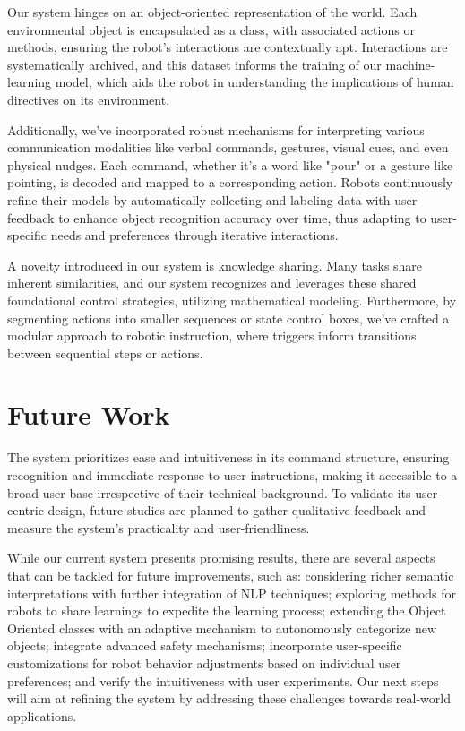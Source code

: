 \documentclass[conference]{IEEEtran}
\begin{document}
Our system hinges on an object-oriented representation of the world. Each environmental object is encapsulated as a class, with associated actions or methods, ensuring the robot's interactions are contextually apt. Interactions are systematically archived, and this dataset informs the training of our machine-learning model, which aids the robot in understanding the implications of human directives on its environment.

Additionally, we've incorporated robust mechanisms for interpreting various communication modalities like verbal commands, gestures, visual cues, and even physical nudges. Each command, whether it's a word like "pour" or a gesture like pointing, is decoded and mapped to a corresponding action. Robots continuously refine their models by automatically collecting and labeling data with user feedback to enhance object recognition accuracy over time, thus adapting to user-specific needs and preferences through iterative interactions.

A novelty introduced in our system is knowledge sharing. Many tasks share inherent similarities, and our system recognizes and leverages these shared foundational control strategies, utilizing mathematical modeling. Furthermore, by segmenting actions into smaller sequences or state control boxes, we've crafted a modular approach to robotic instruction, where triggers inform transitions between sequential steps or actions.

\section{Future Work}

The system prioritizes ease and intuitiveness in its command structure, ensuring recognition and immediate response to user instructions, making it accessible to a broad user base irrespective of their technical background. To validate its user-centric design, future studies are planned to gather qualitative feedback and measure the system's practicality and user-friendliness. 

While our current system presents promising results, there are several aspects that can be tackled for future improvements, such as: considering richer semantic interpretations with further integration of NLP techniques; exploring methods for robots to share learnings to expedite the learning process; extending the Object Oriented classes with an adaptive mechanism to autonomously categorize new objects; integrate advanced safety mechanisms; incorporate user-specific customizations for robot behavior adjustments based on individual user preferences; and verify the intuitiveness with user experiments. Our next steps will aim at refining the system by addressing these challenges towards real-world applications.

\nocite{*}


\end{document}
